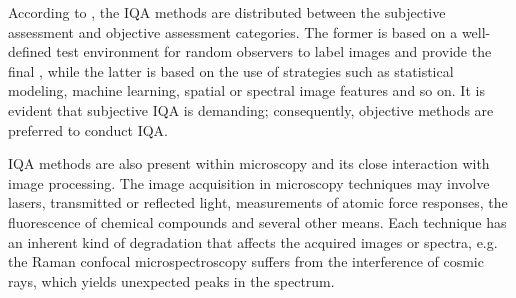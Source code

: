According to , the IQA methods are distributed between the subjective assessment and objective assessment categories. The former is based on a well-defined test environment for random observers to label images and provide the final , while the latter is based on the use of strategies such as statistical modeling, machine learning, spatial or spectral image features and so on. It is evident that subjective IQA is demanding; consequently, objective methods are preferred to conduct IQA.

IQA methods are also present within microscopy and its close interaction with image processing. The image acquisition in microscopy techniques may involve lasers, transmitted or reflected light, measurements of atomic force responses, the fluorescence of chemical compounds and several other means. Each technique has an inherent kind of degradation that affects the acquired images or spectra, e.g. the Raman confocal microspectroscopy suffers from the interference of cosmic rays, which yields unexpected peaks in the spectrum.